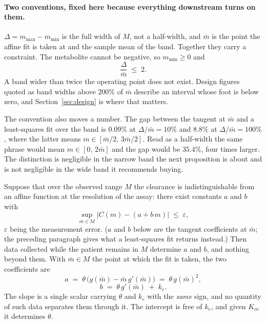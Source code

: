 \paragraph{Two conventions, fixed here because everything downstream turns on them.}
$\Delta = m_{\max} - m_{\min}$ is the full width of $M$, not a half-width, and
$\bar m$ is the point the affine fit is taken at and the sample mean of the band. Together
they carry a constraint. The metabolite cannot be negative, so $m_{\min} \ge 0$ and
\begin{equation}
\frac{\Delta}{\bar m} \;\le\; 2.
\label{eq:bandceiling}
\end{equation}
A band wider than twice the operating point does not exist. Design figures quoted
as band widths above $200\%$ of $\bar m$ describe an interval whose foot is below zero, and
Section~\ref{sec:design} is where that matters.

The convention also moves a number. The gap between the tangent at $\bar m$ and a
least-squares fit over the band is $0.09\%$ at $\Delta/\bar m = 10\%$ and $8.8\%$ at
$\Delta/\bar m = 100\%$, where the latter means $m \in [\bar m/2,\, 3\bar m/2]$. Read as a
half-width the same phrase would mean $m \in [0,\, 2\bar m]$ and the gap would be $35.4\%$,
four times larger. The distinction is negligible in the narrow band the next proposition is
about and is not negligible in the wide band it recommends buying.

\begin{proposition}[Degeneracy]
\label{prop:degeneracy}
Suppose that over the observed range $M$ the clearance is indistinguishable from an affine
function at the resolution of the assay: there exist constants $a$ and $b$ with
\begin{equation}
\sup_{m \in M} \bigl| C(m) - (a + b\,m) \bigr| \;\le\; \varepsilon,
\label{eq:affine}
\end{equation}
$\varepsilon$ being the measurement error. ($a$ and $b$ below are the tangent coefficients
at $\bar m$; the preceding paragraph gives what a least-squares fit returns instead.)
Then data collected while the patient remains in $M$ determine $a$ and $b$, and nothing
beyond them. With $\bar m \in M$ the point at which
the fit is taken, the two coefficients are
\begin{equation}
a \;=\; \theta\,\bigl(g(\bar m) - \bar m\, g'(\bar m)\bigr) \;=\; \theta\, g(\bar m)^2,
\label{eq:intercept}
\end{equation}
\begin{equation}
b \;=\; \theta\, g'(\bar m) \;+\; k_e.
\label{eq:slope}
\end{equation}
The slope is a single scalar carrying $\theta$ and $k_e$ with the \emph{same} sign, and no
quantity of such data separates them through it. The intercept is free of $k_e$, and given
$K_m$ it determines $\theta$.
\end{proposition}

